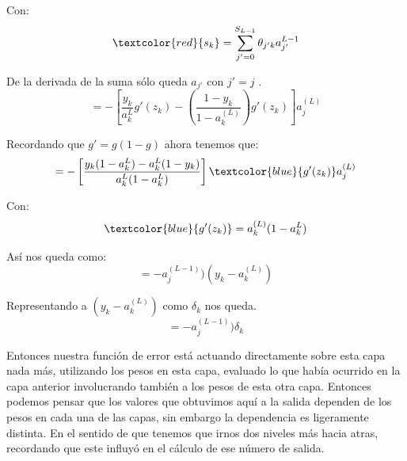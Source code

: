 Con:
\begin{equation}
 \textcolor{red}{s_{k}} = \sum_{j'=0}^{S_{L-1}} \theta_{j'k}a_{j'}^{L-1}
\end{equation}

De la derivada de la suma sólo queda $a_{j'} $ con $j' = j$ .
\begin{equation}
 =-\left[ \dfrac{y_{k}}{a_{k}^{L}} g'(z_{k}) -\left( \dfrac{1-y_{k}}{1-a_{k}^{(L)}} \right) g'(z_{k})\right]a_{j}^{(L)}
\end{equation}

Recordando que $g' = g (1 - g)$ ahora tenemos que:
\begin{equation}
 =-\left[ \dfrac{y_{k}(1-a_{k}^{L})-a_{k}^{L}(1-y_{k})} {a_{k}^{L}(1-a_{k}^{L})} \right]\textcolor{blue}{g'(z_{k})} a_{j}^{(L)}
\end{equation}

Con:
\begin{equation}
 \textcolor{blue}{g'(z_{k})} = a_{k}^{(L)}(1-a_{k}^{L})
\end{equation}

Así nos queda como: 
\begin{equation}
 =-a_{j}^{(L-1)})(y_{k}-a_{k}^{(L)})
\end{equation}

Representando a $(y_{k}-a_{k}^{(L)})$ como $\delta_{k}$ nos queda.
\begin{equation}
 =-a_{j}^{(L-1)})\delta_{k}
\end{equation}

Entonces nuestra función de error está actuando directamente sobre esta capa nada más,  utilizando los pesos en esta capa, evaluado lo que había ocurrido en la capa anterior involucrando también a los pesos de esta otra capa. Entonces podemos pensar que los valores que obtuvimos aquí a la salida dependen de los pesos en cada una de las capas, sin embargo la dependencia es ligeramente distinta. En el sentido de que tenemos que irnos dos niveles más hacia atras, recordando que este influyó en el cálculo de ese número de salida.

